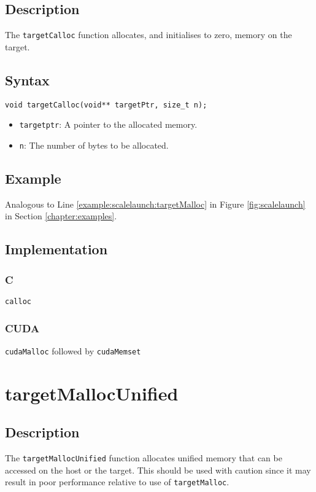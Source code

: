 \subsection{Description}

The \verb+targetCalloc+ function allocates, and initialises to zero, memory on the target.

\subsection{Syntax}
\begin{verbatim}
void targetCalloc(void** targetPtr, size_t n);
\end{verbatim}

\begin{itemize}
\item \verb+targetptr+: A pointer to the allocated memory.
\item \verb+n+: The number of bytes to be allocated.
\end{itemize}


\subsection{Example}
Analogous to Line \ref{example:scalelaunch:targetMalloc} in Figure \ref{fig:scalelaunch} in Section \ref{chapter:examples}.

\subsection{Implementation}
\subsubsection{C}
\verb+calloc+
\subsubsection{CUDA}
\verb+cudaMalloc+ followed by \verb+cudaMemset+

\newpage

\section{targetMallocUnified}

\subsection{Description}

The \verb+targetMallocUnified+ function allocates unified memory that can be accessed on the host or the target. This should be used with caution since it may result in poor performance relative to use of \verb+targetMalloc+.


